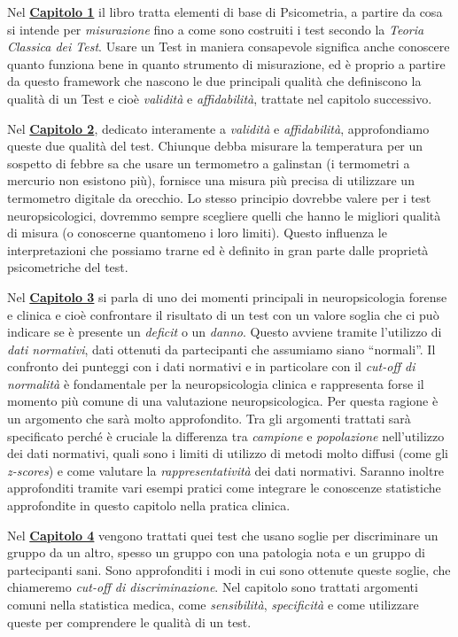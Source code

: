 \documentclass[
  italian,
  letterpaper,
  paper=6in:9in,
  pagesize=pdftex,
  headinclude=on,
  footinclude=on,
  11pt]{scrbook}
\begin{document}
Nel \hyperref[Capitolo-1]{\textbf{Capitolo 1}} il libro tratta elementi
di base di Psicometria, a partire da cosa si intende per
\emph{misurazione} fino a come sono costruiti i test secondo la
\emph{Teoria Classica dei Test}. Usare un Test in maniera consapevole
significa anche conoscere quanto funziona bene in quanto strumento di
misurazione, ed è proprio a partire da questo framework che nascono le
due principali qualità che definiscono la qualità di un Test e cioè
\emph{validità} e \emph{affidabilità}, trattate nel capitolo successivo.

Nel \hyperref[Capitolo-2]{\textbf{Capitolo 2}}, dedicato interamente a
\emph{validità} e \emph{affidabilità}, approfondiamo queste due qualità
del test. Chiunque debba misurare la temperatura per un sospetto di
febbre sa che usare un termometro a galinstan (i termometri a mercurio
non esistono più), fornisce una misura più precisa di utilizzare un
termometro digitale da orecchio. Lo stesso principio dovrebbe valere per
i test neuropsicologici, dovremmo sempre scegliere quelli che hanno le
migliori qualità di misura (o conoscerne quantomeno i loro limiti).
Questo influenza le interpretazioni che possiamo trarne ed è definito in
gran parte dalle proprietà psicometriche del test.

Nel \hyperref[Capitolo-3]{\textbf{Capitolo 3}} si parla di uno dei
momenti principali in neuropsicologia forense e clinica e cioè
confrontare il risultato di un test con un valore soglia che ci può
indicare se è presente un \emph{deficit} o un \emph{danno}. Questo
avviene tramite l'utilizzo di \emph{dati normativi}, dati ottenuti da
partecipanti che assumiamo siano ``normali''. Il confronto dei punteggi
con i dati normativi e in particolare con il \emph{cut-off di normalità}
è fondamentale per la neuropsicologia clinica e rappresenta forse il
momento più comune di una valutazione neuropsicologica. Per questa
ragione è un argomento che sarà molto approfondito. Tra gli argomenti
trattati sarà specificato perché è cruciale la differenza tra
\emph{campione} e \emph{popolazione} nell'utilizzo dei dati normativi,
quali sono i limiti di utilizzo di metodi molto diffusi (come gli
\emph{z-scores}) e come valutare la \emph{rappresentatività} dei dati
normativi. Saranno inoltre approfonditi tramite vari esempi pratici come
integrare le conoscenze statistiche approfondite in questo capitolo
nella pratica clinica.

Nel \hyperref[Capitolo-4]{\textbf{Capitolo 4}} vengono trattati quei
test che usano soglie per discriminare un gruppo da un altro, spesso un
gruppo con una patologia nota e un gruppo di partecipanti sani. Sono
approfonditi i modi in cui sono ottenute queste soglie, che chiameremo
\emph{cut-off di discriminazione}. Nel capitolo sono trattati argomenti
comuni nella statistica medica, come \emph{sensibilità},
\emph{specificità} e come utilizzare queste per comprendere le qualità
di un test.
\end{document}
